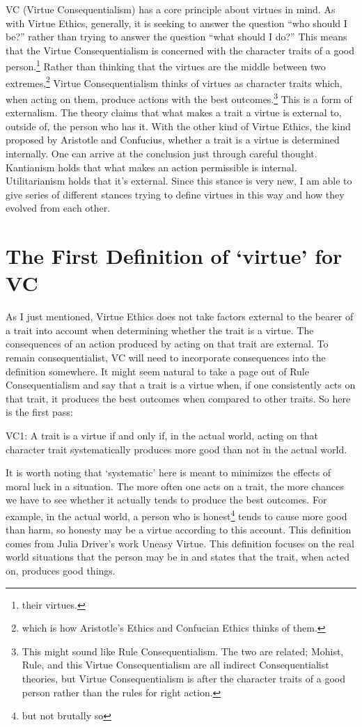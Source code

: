 VC (Virtue Consequentialism) has a core principle about virtues in mind. As with Virtue Ethics, generally, it is seeking to answer the question ``who should I be?'' rather than trying to answer the question ``what should I do?'' This means that the Virtue Consequentialism is concerned with the character traits of a good person.\footnote{their virtues.} Rather than thinking that the virtues are the middle between two extremes,\footnote{which is how Aristotle's Ethics and Confucian Ethics thinks of them.} Virtue Consequentialism thinks of virtues as character traits which, when acting on them, produce actions with the best outcomes.\footnote{This might sound like Rule Consequentialism. The two are related; Mohist, Rule, and this Virtue Consequentialism are all indirect Consequentialist theories, but Virtue Consequentialism is after the character traits of a good person rather than the rules for right action.} This is a form of externalism. The theory claims that what makes a trait a virtue is external to, outside of, the person who has it. With the other kind of Virtue Ethics, the kind proposed by Aristotle and Confucius, whether a trait is a virtue is determined internally. One can arrive at the conclusion just through careful thought. Kantianism holds that what makes an action permissible is internal. Utilitarianism holds that it's external. Since this stance is very new, I am able to give series of different stances trying to define virtues in this way and how they evolved from each other.

\section{The First Definition of ‘virtue’ for VC}

As I just mentioned, Virtue Ethics does not take factors external to the bearer of a trait into account when determining whether the trait is a virtue. The consequences of an action produced by acting on that trait are external.  To remain consequentialist, VC will need to incorporate consequences into the definition somewhere. It might seem natural to take a page out of Rule Consequentialism and say that a trait is a virtue when, if one consistently acts on that trait, it produces the best outcomes when compared to other traits. So here is the first pass:
\begin{center}
VC1: A trait is a virtue if and only if, in the actual world, acting on that character trait systematically produces more good than not in the actual world.
\end{center}
It is worth noting that ‘systematic’ here is meant to minimizes the effects of moral luck in a situation. The more often one acts on a trait, the more chances we have to see whether it actually tends to produce the best outcomes. For example, in the actual world, a person who is honest\footnote{but not brutally so} tends to cause more good than harm, so honesty may be a virtue according to this account. This definition comes from Julia Driver’s work Uneasy Virtue.\autocite{Driver1} This definition focuses on the real world situations that the person may be in and states that the trait, when acted on, produces good things.

